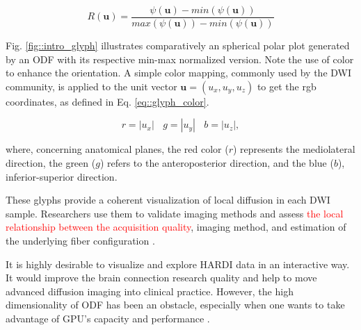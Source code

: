 \documentclass[twoside,twocolumn,10pt]{article}
\begin{document}

\begin{equation}
\label{eq::normglifo}
    R(\bm{u}) = \frac{\psi(\bm{u}) - min(\psi(\bm{u}))}{max(\psi(\bm{u})) - min(\psi(\bm{u}))}
\end{equation}

Fig. \ref{fig::intro_glyph} illustrates comparatively an spherical polar plot generated by an ODF with its respective min-max normalized version. Note the use of color to enhance the orientation. A simple color mapping, commonly used by the DWI community, is applied to the unit vector  $\bm{u} = (u_x, u_y, u_z)$ to get the rgb coordinates, as defined in Eq. \ref{eq::glyph_color}.

\begin{equation}
\label{eq::glyph_color}
    r = |u_x| ~~~~ g = |u_y| ~~~~ b = |u_z|, 
\end{equation}

where, concerning anatomical planes, the red color ($r$) represents the mediolateral direction, the green ($g$) refers to the anteroposterior direction, and the blue ($b$), inferior-superior direction.


These glyphs provide a coherent visualization of local diffusion in each DWI sample. Researchers use them to validate imaging methods \cite{descoteaux2007_QBI,  TuchQBall2004,tournier2007,Tournier2004DirectEO, tuch2002,  yeh2010} and assess \textcolor{red}{the local relationship between the acquisition quality}, imaging method, and estimation of the underlying fiber configuration \cite{cho2008, daducci2014,descoteaux2007, vega2009}. %

It is highly desirable to visualize and explore HARDI data in an interactive way. It would improve the brain connection research quality and help to move advanced diffusion imaging into clinical practice. However, the high dimensionality of ODF has been an obstacle, especially when one wants to take advantage of GPU's capacity and performance \cite{peeters2009}.
\end{document}
